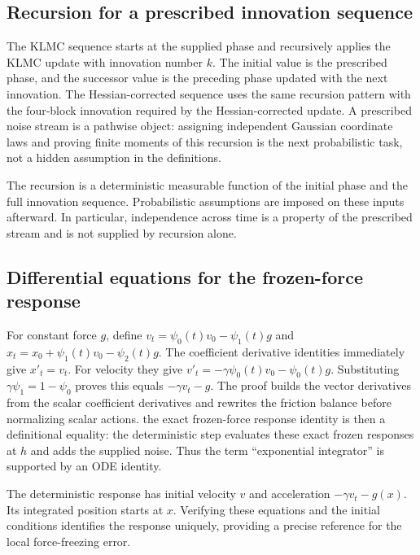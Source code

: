 \documentclass[11pt,a4paper]{report}
\begin{document}
\subsection{\texorpdfstring{Recursion for a prescribed innovation sequence}{Recursion for a prescribed innovation sequence}}
\label{report-step-KineticLangevin-Integrator-lean-5}


The KLMC sequence starts at the supplied phase and recursively applies the KLMC update with innovation number \(k\). The initial value is the prescribed phase, and the successor value is the preceding phase updated with the next innovation. The Hessian-corrected sequence uses the same recursion pattern with the four-block innovation required by the Hessian-corrected update. A prescribed noise stream is a pathwise object: assigning independent Gaussian coordinate laws and proving finite moments of this recursion is the next probabilistic task, not a hidden assumption in the definitions.



The recursion is a deterministic measurable function of the initial phase and the full innovation sequence. Probabilistic assumptions are imposed on these inputs afterward. In particular, independence across time is a property of the prescribed stream and is not supplied by recursion alone.

\subsection{\texorpdfstring{Differential equations for the frozen-force response}{Differential equations for the frozen-force response}}
\label{report-step-KineticLangevin-Integrator-lean-6}


For constant force \(g\), define \(v_t=\psi_0(t)v_0-\psi_1(t)g\) and \(x_t=x_0+\psi_1(t)v_0-\psi_2(t)g\). The coefficient derivative identities immediately give \(x'_t=v_t\). For velocity they give \(v'_t=-\gamma\psi_0(t)v_0-\psi_0(t)g\). Substituting \(\gamma\psi_1=1-\psi_0\) proves this equals \(-\gamma v_t-g\). The proof builds the vector derivatives from the scalar coefficient derivatives and rewrites the friction balance before normalizing scalar actions. the exact frozen-force response identity is then a definitional equality: the deterministic step evaluates these exact frozen responses at \(h\) and adds the supplied noise. Thus the term “exponential integrator” is supported by an ODE identity.



The deterministic response has initial velocity \(v\) and acceleration \(-\gamma v_t-g(x)\). Its integrated position starts at \(x\). Verifying these equations and the initial conditions identifies the response uniquely, providing a precise reference for the local force-freezing error.
\end{document}
